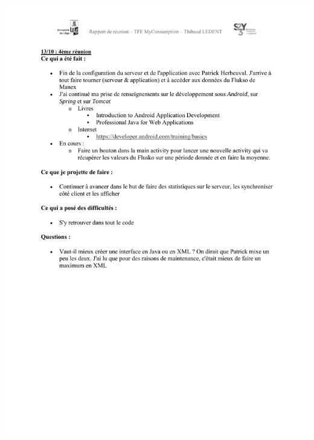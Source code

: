 \documentclass[a4paper, oneside, 11pt]{book}
\begin{document}
\includegraphics[width=1\textwidth]{reports_NB_Part4.pdf}
\newpage
\end{document}
